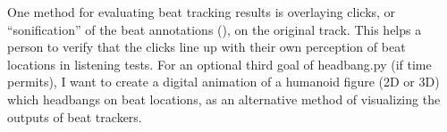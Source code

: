 \documentclass[letter,12pt]{report}
\begin{document}
\qquad One method for evaluating beat tracking results is overlaying clicks, or ``sonification'' of the beat annotations (\cite{clicks}), on the original track. This helps a person to verify that the clicks line up with their own perception of beat locations in listening tests. For an optional third goal of headbang.py (if time permits), I want to create a digital animation of a humanoid figure (2D or 3D) which headbangs on beat locations, as an alternative method of visualizing the outputs of beat trackers.

\vfill
\clearpage

\printbibheading[title={\vspace{-3.5em}References},heading=bibnumbered]
\vspace{-1.5em}
\printbibliography[heading=none]
\end{document}
